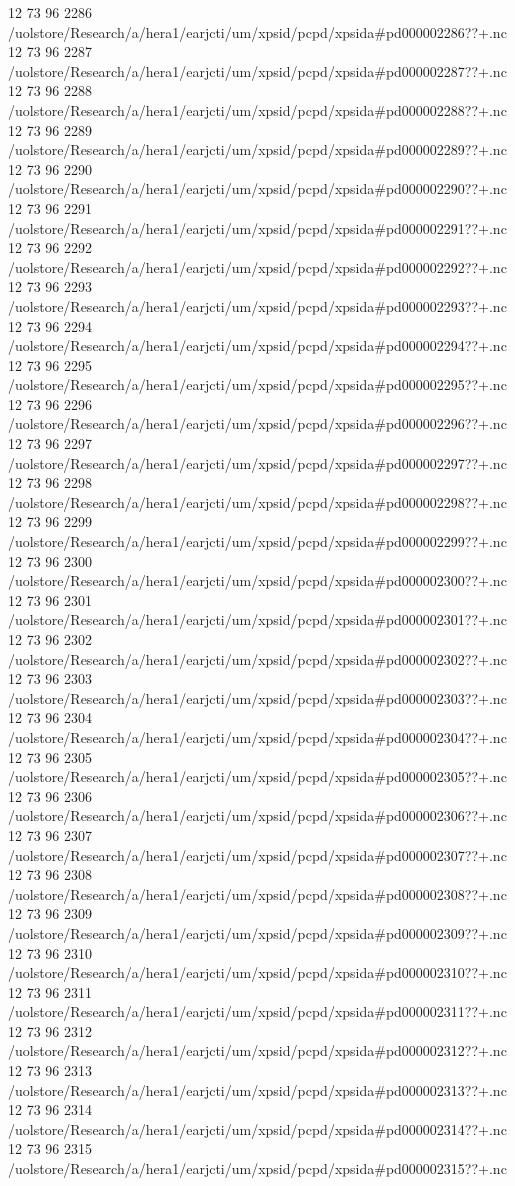 12 73 96
2286
/uolstore/Research/a/hera1/earjcti/um/xpsid/pcpd/xpsida#pd000002286??+.nc
12 73 96
2287
/uolstore/Research/a/hera1/earjcti/um/xpsid/pcpd/xpsida#pd000002287??+.nc
12 73 96
2288
/uolstore/Research/a/hera1/earjcti/um/xpsid/pcpd/xpsida#pd000002288??+.nc
12 73 96
2289
/uolstore/Research/a/hera1/earjcti/um/xpsid/pcpd/xpsida#pd000002289??+.nc
12 73 96
2290
/uolstore/Research/a/hera1/earjcti/um/xpsid/pcpd/xpsida#pd000002290??+.nc
12 73 96
2291
/uolstore/Research/a/hera1/earjcti/um/xpsid/pcpd/xpsida#pd000002291??+.nc
12 73 96
2292
/uolstore/Research/a/hera1/earjcti/um/xpsid/pcpd/xpsida#pd000002292??+.nc
12 73 96
2293
/uolstore/Research/a/hera1/earjcti/um/xpsid/pcpd/xpsida#pd000002293??+.nc
12 73 96
2294
/uolstore/Research/a/hera1/earjcti/um/xpsid/pcpd/xpsida#pd000002294??+.nc
12 73 96
2295
/uolstore/Research/a/hera1/earjcti/um/xpsid/pcpd/xpsida#pd000002295??+.nc
12 73 96
2296
/uolstore/Research/a/hera1/earjcti/um/xpsid/pcpd/xpsida#pd000002296??+.nc
12 73 96
2297
/uolstore/Research/a/hera1/earjcti/um/xpsid/pcpd/xpsida#pd000002297??+.nc
12 73 96
2298
/uolstore/Research/a/hera1/earjcti/um/xpsid/pcpd/xpsida#pd000002298??+.nc
12 73 96
2299
/uolstore/Research/a/hera1/earjcti/um/xpsid/pcpd/xpsida#pd000002299??+.nc
12 73 96
2300
/uolstore/Research/a/hera1/earjcti/um/xpsid/pcpd/xpsida#pd000002300??+.nc
12 73 96
2301
/uolstore/Research/a/hera1/earjcti/um/xpsid/pcpd/xpsida#pd000002301??+.nc
12 73 96
2302
/uolstore/Research/a/hera1/earjcti/um/xpsid/pcpd/xpsida#pd000002302??+.nc
12 73 96
2303
/uolstore/Research/a/hera1/earjcti/um/xpsid/pcpd/xpsida#pd000002303??+.nc
12 73 96
2304
/uolstore/Research/a/hera1/earjcti/um/xpsid/pcpd/xpsida#pd000002304??+.nc
12 73 96
2305
/uolstore/Research/a/hera1/earjcti/um/xpsid/pcpd/xpsida#pd000002305??+.nc
12 73 96
2306
/uolstore/Research/a/hera1/earjcti/um/xpsid/pcpd/xpsida#pd000002306??+.nc
12 73 96
2307
/uolstore/Research/a/hera1/earjcti/um/xpsid/pcpd/xpsida#pd000002307??+.nc
12 73 96
2308
/uolstore/Research/a/hera1/earjcti/um/xpsid/pcpd/xpsida#pd000002308??+.nc
12 73 96
2309
/uolstore/Research/a/hera1/earjcti/um/xpsid/pcpd/xpsida#pd000002309??+.nc
12 73 96
2310
/uolstore/Research/a/hera1/earjcti/um/xpsid/pcpd/xpsida#pd000002310??+.nc
12 73 96
2311
/uolstore/Research/a/hera1/earjcti/um/xpsid/pcpd/xpsida#pd000002311??+.nc
12 73 96
2312
/uolstore/Research/a/hera1/earjcti/um/xpsid/pcpd/xpsida#pd000002312??+.nc
12 73 96
2313
/uolstore/Research/a/hera1/earjcti/um/xpsid/pcpd/xpsida#pd000002313??+.nc
12 73 96
2314
/uolstore/Research/a/hera1/earjcti/um/xpsid/pcpd/xpsida#pd000002314??+.nc
12 73 96
2315
/uolstore/Research/a/hera1/earjcti/um/xpsid/pcpd/xpsida#pd000002315??+.nc
